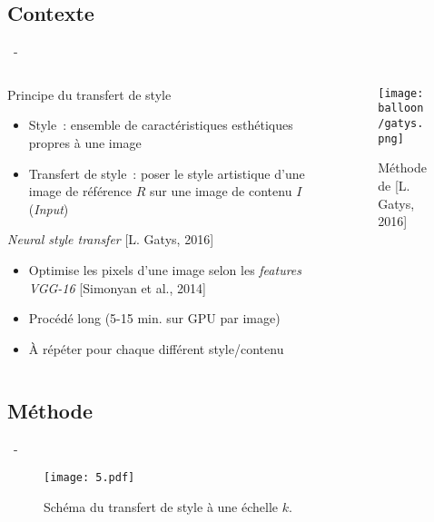 \documentclass[aspectratio=169, 22pt]{beamer}
\begin{document}
\subsection{Contexte}
\begin{frame}{\secname~- \subsecname}
  \begin{columns}
    \begin{column}{0.6\linewidth}
      \begin{customblock}{Principe du transfert de style}
        \begin{itemize}
        \item \small Style : ensemble de \alert{caractéristiques esthétiques} propres à une image
        \item \small Transfert de style : poser le style artistique d'une
          image de \alert{référence} $R$ sur une image de \alert{contenu} $I$ (\emph{Input})
        \end{itemize}    
      \end{customblock}
      \begin{block}{\emph{Neural style transfer} [L. Gatys, 2016]}
        \begin{itemize}
        \item \small Optimise les pixels d'une image selon les
          \emph{features} \emph{VGG-16} [Simonyan et al., 2014]
        \item \small Procédé \alert{long} (5-15 min. sur GPU par image)
        \item \small À répéter pour chaque différent style/contenu
        \end{itemize}
      \end{block}
    \end{column}
    \begin{column}{0.4\linewidth}
      \begin{figure}
        \centering
        \texttt{[image: balloon/gatys.png]}
        \caption{Méthode de [L. Gatys, 2016]}
      \end{figure}
    \end{column}
  \end{columns}
\end{frame}

\subsection{Méthode}
\begin{frame}{\secname~- \subsecname}
  \begin{figure}
    \centering
    \texttt{[image: 5.pdf]}
    \caption{Schéma du transfert de style à une échelle $k$.}
  \end{figure}
\end{frame}
\end{document}
